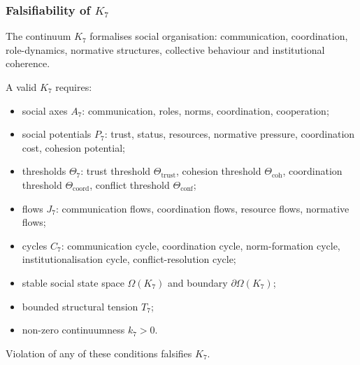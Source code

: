 
\subsubsection{Falsifiability of \texorpdfstring{$K_7$}{K_7}}
\label{sec:falsifiability-k7}

The continuum $K_7$ formalises social organisation:
communication, coordination, role-dynamics, normative structures,
collective behaviour and institutional coherence.

A valid $K_7$ requires:

\begin{itemize}
    \item social axes $A_7$: communication, roles, norms, coordination, cooperation;
    \item social potentials $P_7$: trust, status, resources, normative pressure,
          coordination cost, cohesion potential;
    \item thresholds $\Theta_7$: trust threshold $\Theta_{\mathrm{trust}}$,
          cohesion threshold $\Theta_{\mathrm{coh}}$,
          coordination threshold $\Theta_{\mathrm{coord}}$,
          conflict threshold $\Theta_{\mathrm{conf}}$;
    \item flows $J_7$: communication flows, coordination flows,
          resource flows, normative flows;
    \item cycles $C_7$: communication cycle, coordination cycle,
          norm-formation cycle, institutionalisation cycle,
          conflict-resolution cycle;
    \item stable social state space $\Omega(K_7)$ and boundary $\partial\Omega(K_7)$;
    \item bounded structural tension $T_7$;
    \item non-zero continuumness $k_7>0$.
\end{itemize}

Violation of any of these conditions falsifies $K_7$.



